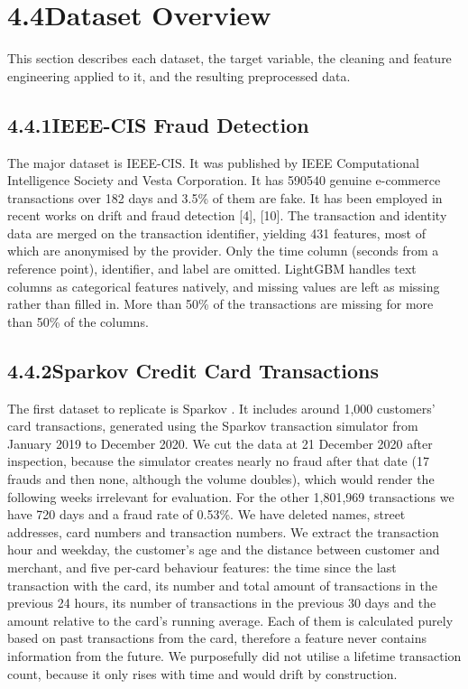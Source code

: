 \documentclass[11pt,letterpaper]{report}
\begin{document}
\section*{4.4\quad Dataset Overview}

This section describes each dataset, the target variable, the cleaning and feature engineering applied to it, and the resulting preprocessed data.

\subsection*{4.4.1\quad IEEE-CIS Fraud Detection}

The major dataset is IEEE-CIS. It was published by IEEE Computational Intelligence Society and Vesta Corporation. It has 590540 genuine e-commerce transactions over 182 days and 3.5\% of them are fake. It has been employed in recent works on drift and fraud detection [4], [10]. The transaction and identity data are merged on the transaction identifier, yielding 431 features, most of which are anonymised by the provider. Only the time column (seconds from a reference point), identifier, and label are omitted. LightGBM handles text columns as categorical features natively, and missing values are left as missing rather than filled in. More than 50\% of the transactions are missing for more than 50\% of the columns.

\subsection*{4.4.2\quad Sparkov Credit Card Transactions}

The first dataset to replicate is Sparkov . It includes around 1,000 customers' card transactions, generated using the Sparkov transaction simulator from January 2019 to December 2020. We cut the data at 21 December 2020 after inspection, because the simulator creates nearly no fraud after that date (17 frauds and then none, although the volume doubles), which would render the following weeks irrelevant for evaluation. For the other 1,801,969 transactions we have 720 days and a fraud rate of 0.53\%. We have deleted names, street addresses, card numbers and transaction numbers. We extract the transaction hour and weekday, the customer's age and the distance between customer and merchant, and five per-card behaviour features: the time since the last transaction with the card, its number and total amount of transactions in the previous 24 hours, its number of transactions in the previous 30 days and the amount relative to the card's running average. Each of them is calculated purely based on past transactions from the card, therefore a feature never contains information from the future. We purposefully did not utilise a lifetime transaction count, because it only rises with time and would drift by construction.
\end{document}
